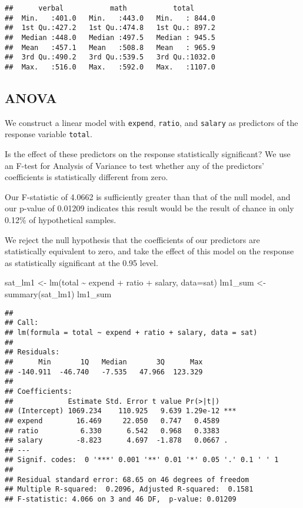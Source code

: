 \documentclass[
]{article}
\newenvironment{Shaded}{\begin{snugshade}}{\end{snugshade}}
\newcommand{\AttributeTok}[1]{\textcolor[rgb]{0.77,0.63,0.00}{#1}}
\newcommand{\FunctionTok}[1]{\textcolor[rgb]{0.00,0.00,0.00}{#1}}
\newcommand{\NormalTok}[1]{#1}
\newcommand{\OtherTok}[1]{\textcolor[rgb]{0.56,0.35,0.01}{#1}}
\newcommand{\SpecialCharTok}[1]{\textcolor[rgb]{0.00,0.00,0.00}{#1}}
\begin{document}
\begin{verbatim}
##      verbal           math           total       
##  Min.   :401.0   Min.   :443.0   Min.   : 844.0  
##  1st Qu.:427.2   1st Qu.:474.8   1st Qu.: 897.2  
##  Median :448.0   Median :497.5   Median : 945.5  
##  Mean   :457.1   Mean   :508.8   Mean   : 965.9  
##  3rd Qu.:490.2   3rd Qu.:539.5   3rd Qu.:1032.0  
##  Max.   :516.0   Max.   :592.0   Max.   :1107.0
\end{verbatim}

\hypertarget{anova}{%
\subsection{ANOVA}\label{anova}}

We construct a linear model with \texttt{expend}, \texttt{ratio}, and
\texttt{salary} as predictors of the response variable \texttt{total}.

Is the effect of these predictors on the response statistically
significant? We use an F-test for Analysis of Variance to test whether
any of the predictors' coefficients is statistically different from
zero.

Our F-statistic of 4.0662 is sufficiently greater than that of the null
model, and our p-value of 0.01209 indicates this result would be the
result of chance in only 0.12\% of hypothetical samples.

We reject the null hypothesis that the coefficients of our predictors
are statistically equivalent to zero, and take the effect of this model
on the response as statistically significant at the 0.95 level.

\begin{Shaded}
\begin{Highlighting}[]
\NormalTok{sat\_lm1 }\OtherTok{\textless{}{-}} \FunctionTok{lm}\NormalTok{(total }\SpecialCharTok{\textasciitilde{}}\NormalTok{ expend }\SpecialCharTok{+}\NormalTok{ ratio }\SpecialCharTok{+}\NormalTok{ salary, }\AttributeTok{data=}\NormalTok{sat)}
\NormalTok{lm1\_sum }\OtherTok{\textless{}{-}} \FunctionTok{summary}\NormalTok{(sat\_lm1)}
\NormalTok{lm1\_sum}
\end{Highlighting}
\end{Shaded}

\begin{verbatim}
## 
## Call:
## lm(formula = total ~ expend + ratio + salary, data = sat)
## 
## Residuals:
##      Min       1Q   Median       3Q      Max 
## -140.911  -46.740   -7.535   47.966  123.329 
## 
## Coefficients:
##             Estimate Std. Error t value Pr(>|t|)    
## (Intercept) 1069.234    110.925   9.639 1.29e-12 ***
## expend        16.469     22.050   0.747   0.4589    
## ratio          6.330      6.542   0.968   0.3383    
## salary        -8.823      4.697  -1.878   0.0667 .  
## ---
## Signif. codes:  0 '***' 0.001 '**' 0.01 '*' 0.05 '.' 0.1 ' ' 1
## 
## Residual standard error: 68.65 on 46 degrees of freedom
## Multiple R-squared:  0.2096, Adjusted R-squared:  0.1581 
## F-statistic: 4.066 on 3 and 46 DF,  p-value: 0.01209
\end{verbatim}
\end{document}

